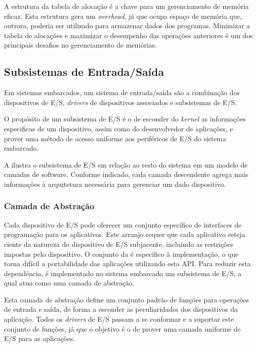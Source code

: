 A estrutura da tabela de alocação é a chave para um gerenciamento de memória eficaz. Esta estrutura gera um \emph{overhead}, já que ocupa espaço de memória que, outrora, poderia ser utilizado para armazenar dados dos programas. Minimizar a tabela de alocações e maximizar o desempenho das operações anteriores é um dos principais desafios no gerenciamento de memórias.

\subsection{Subsistemas de Entrada/Saída}

Em sistemas embarcados, um sistema de entrada/saída são a combinação dos dispositivos de E/S, \emph{drivers} de dispositivos associados e subsistemas de E/S.

O propósito de um subsistema de E/S é o de esconder do \emph{kernel} as informações especificas de um dispositivo, assim como do desenvolvedor de aplicações, e prover uma método de acesso uniforme aos periféricos de E/S do sistema embarcado.

A  ilustra o subsistema de E/S em relação ao resto do sistema em um modelo de camadas de software. Conforme indicado, cada camada descendente agrega mais informações à arquitetura necessária para gerenciar um dado dispositivo.


\subsubsection{Camada de Abstração}

Cada dispositivo de E/S pode oferecer um conjunto específico de interfaces de programação para os aplicativos. Este arranjo requer que cada aplicativo esteja ciente da natureza do dispositivo de E/S subjacente, incluindo as restrições impostas pelo dispositivo. O conjunto da  é específico à implementação, o que torna difícil a portabilidade das aplicações utilizando esta API. Para reduzir esta dependência, é implementado no sistema embarcado um subsistema de E/S, a qual atua como uma camada de abstração.

Esta camada de abstração define um conjunto padrão de funções para operações de entrada e saída, de forma a esconder as peculiaridades dos dispositivos da aplicação. Todos os \emph{drivers} de E/S passam a se conformar e a suportar este conjunto de funções, já que o objetivo é o de prover uma camada uniforme de E/S para as aplicações. 

